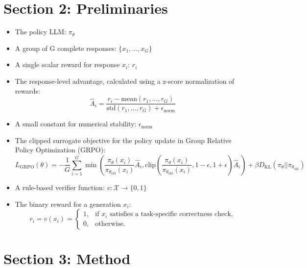 \documentclass{article}
\begin{document}
\section*{Section 2: Preliminaries}

\begin{itemize}
    \item The policy LLM: $\pi_{\theta}$
    \item A group of G complete responses: $\{x_{1},...,x_{G}\}$
    \item A single scalar reward for response $x_i$: $r_{i}$
    \item The response-level advantage, calculated using a z-score normalization of rewards:
        $$\hat{A}_{i}=\frac{r_{i}-\text{mean}(r_{1},...,r_{G})}{\text{std}(r_{1},...,r_{G})+\epsilon_{\text{norm}}}$$
    \item A small constant for numerical stability: $\epsilon_{\text{norm}}$
    \item The clipped surrogate objective for the policy update in Group Relative Policy Optimization (GRPO):
        $$L_{\text{GRPO}}(\theta) = -\frac{1}{G}\sum_{i=1}^{G} \min\left(\frac{\pi_{\theta}(x_i)}{\pi_{\theta_{\text{old}}}(x_i)}\hat{A}_i, \text{clip}\left(\frac{\pi_{\theta}(x_i)}{\pi_{\theta_{\text{old}}}(x_i)}, 1-\epsilon, 1+\epsilon\right)\hat{A}_i\right) + \beta D_{\text{KL}}(\pi_{\theta}||\pi_{\theta_{\text{old}}})$$
    \item A rule-based verifier function: $v:\mathcal{X}\rightarrow\{0,1\}$
    \item The binary reward for a generation $x_i$:
        $$r_i = v(x_i) = \begin{cases} 1, & \text{if } x_i \text{ satisfies a task-specific correctness check,} \\ 0, & \text{otherwise.} \end{cases}$$
\end{itemize}

\section*{Section 3: Method}
\end{document}
